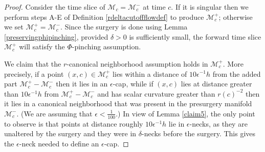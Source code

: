 \documentclass[12pt]{amsart}
\newcommand{\M}{{\mathcal M}}
\newcommand{\de}{\delta}
\numberwithin{equation}{section}
\theoremstyle{plain}
\theoremstyle{definition}
\theoremstyle{remark}
\begin{document}
\begin{proof}
Consider the time slice of $\M_c = \M_c^-$ at time $c$.
If it is
singular then we perform steps A-E of Definition \ref{rdeltacutoffflowdef}
to produce $\M_c^+$; otherwise we set $\M_c^+=\M_c^-$.
Since the surgery is done using Lemma \ref{preservingphipinching},
provided $\de>0$ is sufficiently small, 
the forward time slice $\M_c^+$ will satisfy the $\Phi$-pinching 
assumption.  

We claim that the $r$-canonical neighborhood
assumption holds in $\M_c^+$.
More precisely, if a point
$(x,c) \in \M_c^+$ lies within a distance of $10 \epsilon^{-1} h$ from
the added part $\M_c^+ - \M_c^-$ then it lies in an
$\epsilon$-cap, while if $(x,c)$ lies at distance greater than
$10 \epsilon^{-1} h$ from $\M_c^+ - \M_c^-$ and has
scalar curvature greater than $r(c)^{-2}$ then it lies in a 
canonical neighborhood that was present in the presurgery manifold
$\M_c^-$.
(We are assuming that $\epsilon < \frac{1}{100}$.)
In view of  Lemma \ref{claim5},
the only point to observe is that points at distance roughly
$10 \epsilon^{-1} h$ lie in $\epsilon$-necks, as they are unaltered
by the surgery and they were in $\delta$-necks before the surgery.
This gives the $\epsilon$-neck needed to define an
$\epsilon$-cap.


\end{proof}
\end{document}
